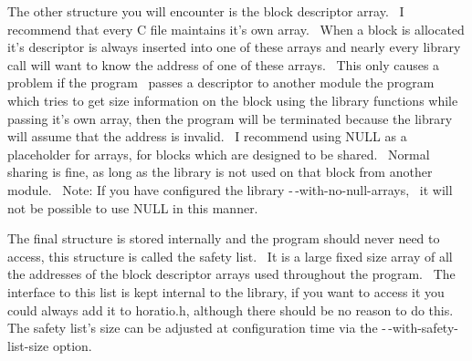 \documentclass{article}
\begin{document}
\par The other structure you will encounter is the block descriptor
array.~
I recommend that every C file maintains it's own array.~ When a
block
is allocated it's descriptor is always inserted into one of these arrays
and nearly every library call will want to know the address of one of
these
arrays.~ This only causes a problem if the program~ passes a
descriptor to another module the program which tries to get size
information
on the block using the library functions while passing it's own array,
then the program will be terminated because the library will assume
that
the address is invalid.~ I recommend using NULL as a placeholder
for
arrays, for blocks which are designed to be shared.~ Normal
sharing
is fine, as long as the library is not used on that block from another
module.~ Note: If you have configured the library
-$\,$-with-no-null-arrays,~ it will not be possible to use NULL in
this manner.\\

\par The final structure is stored internally and the program should
never
need to access, this structure is called the safety list.~ It is a
large fixed size array of all the addresses of the block descriptor
arrays
used throughout the program.~ The interface to this list is kept
internal
to the library, if you want to access it you could always add it to
horatio.h,
although there should be no reason to do this.~ The safety list's
size can be adjusted at configuration time via the
-$\,$-with-safety-list-size option.\\
\end{document}
